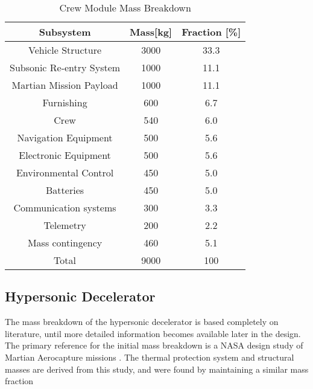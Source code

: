 \begin{table}[H]
	\caption{Crew Module Mass Breakdown}
	\begin{tabular}{|c|c|c|}
    \hline
    Subsystem        					& Mass[kg] 	& Fraction [\%] \\ \hline \hline
    Vehicle Structure 				& 3000			& 33.3 					\\ \hline 
		Subsonic Re-entry System	& 1000			& 11.1					\\ \hline
		Martian Mission Payload 	& 1000			& 11.1 					\\ \hline
		Furnishing								& 600				& 6.7 					\\ \hline
		Crew											& 540				& 6.0						\\ \hline
		Navigation Equipment			& 500				& 5.6						\\ \hline
		Electronic Equipment 			& 500				& 5.6						\\ \hline
		Environmental Control			& 450				& 5.0						\\ \hline
		Batteries									&	450				&	5.0						\\ \hline
		Communication systems			& 300				& 3.3						\\ \hline
		Telemetry									& 200				& 2.2						\\ \hline
		Mass contingency					&	460				& 5.1						\\ \hline
		Total											&	9000			& 100						\\ \hline
    \end{tabular}
    \label{tab:CVMB}
\end{table}

\subsection{Hypersonic Decelerator}
The mass breakdown of the hypersonic decelerator is based completely on literature, until more detailed information becomes available later in the design. The primary reference for the initial mass breakdown is a NASA design study of Martian Aerocapture missions \cite{Cianciolo2010}. The thermal protection system and structural masses are derived from this study, and were found by maintaining a similar mass fraction  




